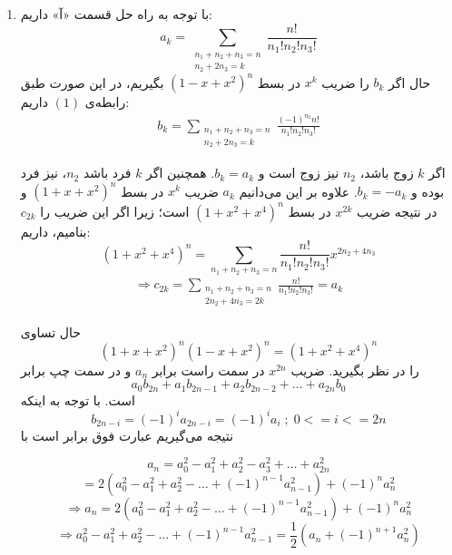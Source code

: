 \begin{enumerate}
	\item
        \p
    	با توجه به راه حل قسمت 
        «آ»
        داریم:
        \[
            a_k = \sum_{\substack{n_1 + n_2 + n_3 = n \\ n_2 + 2n_3 = k}} \frac{n!}{n_1!n_2!n_3!}
        \]
    	حال اگر 
        $b_k$
        را ضریب 
        $x^k$
         در بسط 
         $(1 - x + x^2)^n$
        بگیریم، در این صورت 
        طبق رابطه‌ی 
        $(1)$
        داریم:
        \begin{align*}
            b_k = \sum_{\substack{n_1 + n_2 + n_3 =  n\\  n_2 + 2n_3 = k}} \frac{(-1)^{n_2}n!}{n_1!n_2!n_3!}
        \end{align*}

    	اگر 
         $k$
        زوج باشد،
        $n_2$
        نیز زوج است و 
        $b_k = a_k$.
        همچنین اگر 
        $k$
        فرد باشد
        $n_2$، 
        نیز فرد بوده و $b_k = -a_k$.
        علاوه بر این می‌دانیم 
        $a_k$
        ضریب 
        $x^k$
        در بسط 
        $(1 + x + x^2)^n$
        و در نتیجه ضریب 
        $x^{2k}$
        در بسط 
        $(1 + x^2 + x^4)^n$
        است؛ زیرا اگر این ضریب را
        $c_{2k}$
        بنامیم، داریم: 
        $$(1+x^2+x^4)^n=\sum_{n_1+n_2+n_3=n} \frac{n!}{n_1!n_2!n_3!} x^{2n_2+4n_3}$$
        \begin{align*}
            \Rightarrow c_{2k} = \sum_{\substack{n_1+n_2+n_3=n\\  2n_2 + 4n_3 = 2k}} \frac{n!}{n_1!n_2!n_3!} = a_{k}
        \end{align*}
        
         \p
         حال تساوی
        $$(1 + x + x^2)^n(1 - x + x^2)^n = (1 + x^2 + x^4)^n$$
        را در نظر بگیرید. ضریب
        $x^{2n}$
         در سمت راست برابر 
         $a_n$
          و در سمت چپ برابر
        $$a_0b_{2n} + a_1b_{2n - 1} + a_2b_{2n - 2} + \dots + a_{2n}b_0$$
        است. با توجه به اینکه
        $$b_{2n-i} = (-1)^i a_{2n-i} = (-1)^i a_{i} \; ; \; 0 <= i <= 2n$$
        نتیجه می‌گیریم عبارت فوق برابر است با
        
        $$a_n = a_0^2 - a_1^2 + a_2^2 - a_3^2 + \dots + a_{2n}^2 $$
        $$= 2(a_0^2 - a_1^2 + a_2^2 - \dots + (-1)^{n - 1}a_{n - 1}^2) + (-1)^n a_n^2$$
        $$\Rightarrow a_n = 2(a_0^2 - a_1^2 + a_2^2 - \dots + (-1)^{n - 1}a_{n - 1}^2) + (-1)^n a_n^2 $$
        $$\Rightarrow a_0^2 - a_1^2 + a_2^2 - ... + (-1)^{n - 1}a_{n - 1}^2 = \frac{1}{2}(a_n + (-1)^{n + 1}a_n^2)$$
        
	\end{enumerate}
